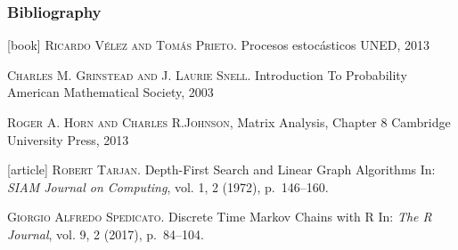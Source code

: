 \begin{frame}\frametitle{Bibliography}
 \fontsize{8pt}{0}\selectfont
 \vspace{2em}
 \begin{thebibliography}{99}
  [book]
     \textsc{Ricardo Vélez and Tomás Prieto}.
     \newblock Procesos estocásticos
     \newblock UNED, 2013
   
     \textsc{Charles M. Grinstead and J. Laurie Snell}.
     \newblock Introduction To Probability
     \newblock American Mathematical Society, 2003

     \textsc{Roger A. Horn and Charles R.Johnson},
     \newblock Matrix Analysis, Chapter 8
     \newblock Cambridge University Press, 2013
   
   [article]
     \textsc{Robert Tarjan}.
     \newblock Depth-First Search and Linear Graph Algorithms
     \newblock In: \emph{{SIAM} Journal on Computing}, vol. 1, 2 (1972), p.~146--160.
    
     \textsc{Giorgio Alfredo Spedicato}.
     \newblock Discrete Time Markov Chains with R
     \newblock In: \emph{The R Journal}, vol. 9, 2 (2017), p.~84--104.
   
 \end{thebibliography}
\end{frame}
